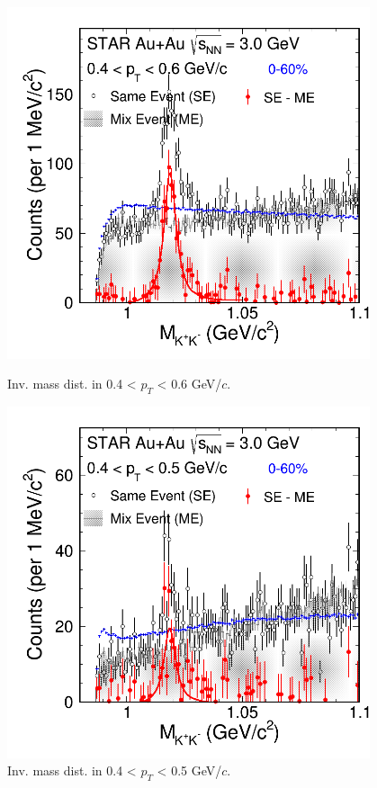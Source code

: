 \begin{figure}[htbp]
\begin{minipage}[htbp]{0.55\linewidth}
\centering
\includegraphics[width=0.95\textwidth]{chapterY/fig/fig1_signal_0_0.png}
\caption{Inv. mass dist. in 0.4 < $p_T$ < 0.6 GeV/$c$. \label{fig:mixedEvent_pT0}}
\end{minipage}
\hfill
\begin{minipage}[htbp]{0.55\linewidth}
\centering
\includegraphics[width=0.95\textwidth]{chapterY/fig/fig1_signal_0_1.png} 
\caption{Inv. mass dist. in 0.4 < $p_T$ < 0.5 GeV/$c$. \label{fig:mixedEvent_pT1}}
\end{minipage}
\end{figure}

